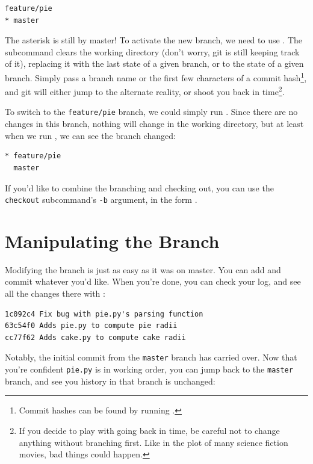 \documentclass[11pt,letterpaper,twoside]{report}
\begin{document}
\begin{lstlisting}[numbers=none]
  feature/pie
* master
\end{lstlisting}

The asterisk is still by master! To activate the new branch, we need to use
. The subcommand clears the working directory (don't worry,
git is still keeping track of it), replacing it with the last state of a given
branch, or to the state of a given branch. Simply pass  a
branch name or the first few characters of a commit hash\footnote{Commit hashes
can be found by running .}, and git will either jump to the
alternate reality, or shoot you back in time\footnote{If you decide to play with
going back in time, be careful not to change anything without branching first.
Like in the plot of many science fiction movies, bad things could happen.}.

To switch to the \texttt{feature/pie} branch, we could simply run
. Since there are no changes in this branch,
nothing will change in the working directory, but at least when we run
, we can see the branch changed:

\begin{lstlisting}[numbers=none]
* feature/pie
  master
\end{lstlisting}

If you'd like to combine the branching and checking out, you can use the
\texttt{checkout} subcommand's \texttt{-b} argument, in the form
.

\section{Manipulating the Branch}

Modifying the branch is just as easy as it was on master. You can add and commit
whatever you'd like. When you're done, you can check your log, and see all the
changes there with  \cite{git-manpages}:

\begin{lstlisting}[numbers=none]
1c092c4 Fix bug with pie.py's parsing function
63c54f0 Adds pie.py to compute pie radii
cc77f62 Adds cake.py to compute cake radii
\end{lstlisting}

Notably, the initial commit from the \texttt{master} branch has carried over.
Now that you're confident \texttt{pie.py} is in working order, you can jump back
to the \texttt{master} branch, and see you history in that branch is unchanged:
\end{document}
